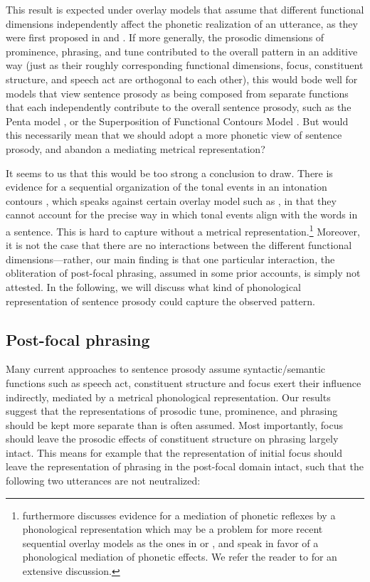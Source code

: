 \documentclass[preprint,review,12pt,authoryear,times]{elsarticle}
\begin{document}
This result is expected under overlay models that assume that different functional dimensions independently affect the phonetic realization of an utterance, as they were first proposed in \citet{ohman67} and  \citet{fujis81}. If more generally, the prosodic dimensions of prominence, phrasing, and tune contributed to the overall pattern in an additive way (just as their roughly corresponding functional dimensions, focus, constituent structure, and speech act are orthogonal to each other),  this would bode well for models that view sentence prosody as being composed from separate functions that each independently contribute to the overall sentence prosody, such as the Penta model  \citep{xu05}, or the Superposition of Functional Contours Model \citep{baill05,geraz18}. But would this necessarily mean that we should adopt a more phonetic view of sentence prosody, and abandon a mediating metrical representation? 

It seems to us that this would be too strong a conclusion to draw. There is evidence for a sequential organization of the tonal events in an intonation contours \citep{ladd08}, which speaks against certain overlay model such as  \citet{fujis81}, in that they cannot account for the precise way in which tonal events align with the words in a sentence. This is hard to capture without a metrical representation.\footnote{\citet{ladd08} furthermore discusses evidence for a  mediation of phonetic reflexes by a phonological representation which may be a problem for more recent sequential overlay models as the ones in \citet{mobiu93} or \citet{xu05}, and speak in favor of a phonological mediation of phonetic effects.  We refer the reader to \citet{ladd08} for an extensive discussion.} Moreover, it is not the case that there are no interactions between the different functional dimensions---rather, our main finding is that one particular interaction, the obliteration of post-focal phrasing, assumed in some prior accounts, is simply not attested. In the following, we will discuss what kind of phonological representation of sentence prosody could capture the observed pattern. 


\subsection{Post-focal phrasing}

Many current approaches to sentence prosody assume syntactic/semantic functions such as speech act, constituent structure and focus exert their influence indirectly, mediated by a metrical phonological representation. Our results suggest that the representations of prosodic tune, prominence, and phrasing should be kept more separate than is often assumed. Most importantly, focus should leave the prosodic effects of constituent structure on phrasing largely intact. This means for example that the representation of initial focus  should leave the representation of phrasing in the post-focal domain intact, such that the following two utterances are not neutralized:
\end{document}
